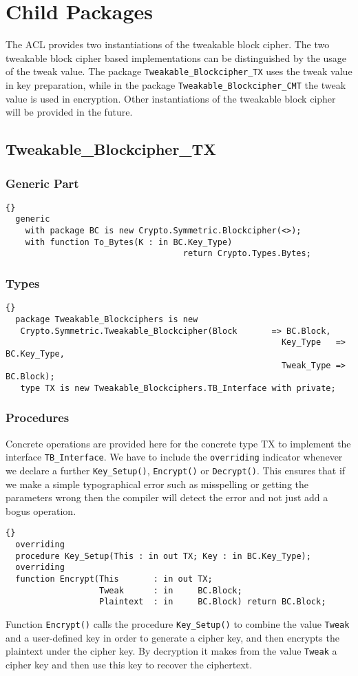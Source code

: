 \section{Child Packages}
The ACL provides two instantiations of the tweakable block cipher. The two tweakable block cipher based implementations can be distinguished by the usage of the tweak value. The package \texttt{Tweakable\_Blockcipher\_TX} uses the tweak value in key preparation, while in the package \texttt{Tweakable\_Blockcipher\_CMT} the tweak value is used in encryption. Other instantiations of the tweakable block cipher will be provided in the future.
\subsection*{Tweakable\_Blockcipher\_TX}
\subsubsection*{Generic Part}
\begin{lstlisting}{}
  generic
    with package BC is new Crypto.Symmetric.Blockcipher(<>);
    with function To_Bytes(K : in BC.Key_Type) 
    								return Crypto.Types.Bytes;
\end{lstlisting}
\subsubsection*{Types}
\begin{lstlisting}{}
  package Tweakable_Blockciphers is new
   Crypto.Symmetric.Tweakable_Blockcipher(Block   	  => BC.Block,
														Key_Type   => BC.Key_Type,
														Tweak_Type => BC.Block);
   type TX is new Tweakable_Blockciphers.TB_Interface with private;
\end{lstlisting}
\subsubsection*{Procedures}
Concrete operations are provided here for the concrete type TX to implement the interface \texttt{TB\_Interface}.
We have to include the \texttt{overriding} indicator whenever we declare a further \texttt{Key\_Setup()}, \texttt{Encrypt()} or \texttt{Decrypt()}. This ensures that if we make a simple typographical error such as misspelling or getting the parameters wrong then the compiler will detect the error and not just add a bogus operation.
\begin{lstlisting}{}
  overriding
  procedure Key_Setup(This : in out TX; Key : in BC.Key_Type);
  overriding
  function Encrypt(This       : in out TX;
                   Tweak      : in     BC.Block;
                   Plaintext  : in     BC.Block) return BC.Block;
\end{lstlisting}
Function \texttt{Encrypt()} calls the procedure \texttt{Key\_Setup()} to combine the value \texttt{Tweak} and a user-defined key in order to generate a cipher key, and then encrypts the plaintext under the cipher key. By decryption it makes from the value \texttt{Tweak} a cipher key and then use this key to recover the ciphertext.
